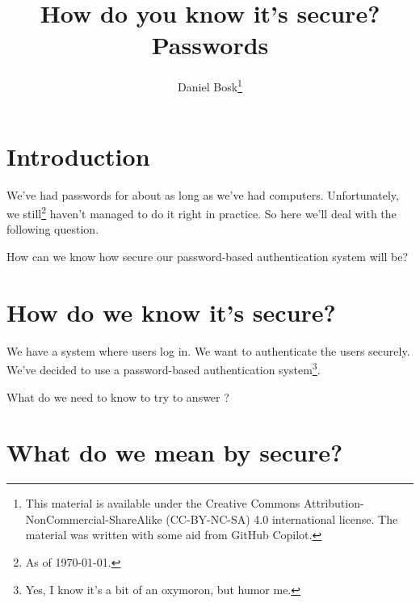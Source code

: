 \title{%
  How do you know it's secure?
  Passwords
}
\author{Daniel Bosk\thanks{%
    This material is available under the Creative Commons 
    Attribution-NonCommercial-ShareAlike (CC-BY-NC-SA) 4.0 international 
    license.
    The material was written with some aid from GitHub Copilot.
}}

\begin{frame}
  \maketitle
\end{frame}

\mode*

\begin{abstract}
  
\end{abstract}

\clearpage

\section<article>{Introduction}

We've had passwords for about as long as we've had computers.
Unfortunately, we still\footnote{As of \today.} haven't managed to do it right 
in practice.
So here we'll deal with the following question.

\begin{question}\label{RQ}
  How can we know how secure our password-based authentication system will be?
\end{question}


\section[How do we know?]{How do we know it's secure?}

\begin{frame}
We have a system where users log in.
We want to authenticate the users securely.
We've decided to use a password-based authentication system\footnote{%
  Yes, I know it's a bit of an oxymoron, but humor me.
}.

  \begin{exercise}
    What do we need to know to try to answer
    ?
  \end{exercise}
\end{frame}


\section[Define secure?]{What do we mean by secure?}

